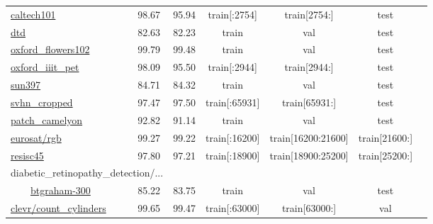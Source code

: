 \documentclass{article} \usepackage{iclr2023_conference,times}
\begin{document}
\begin{table*}[h]
\begin{tabular}{lcccccc}
\href{https://www.tensorflow.org/datasets/catalog/caltech101}{caltech101}
&  98.67  &  95.94
& train[{\tiny:2754}] & train[{\tiny2754:}] & test
& \citep{FeiFei2004LearningGV}
\\
\href{https://www.tensorflow.org/datasets/catalog/dtd}{dtd}
&  82.63  &  82.23
& train & val & test
& \citep{Cimpoi2014DescribingTI}
\\
\href{https://www.tensorflow.org/datasets/catalog/oxford_flowers102}{oxford\_flowers102}
&  99.79  &  99.48
& train & val & test
& \hspace{-10pt}\citep{Nilsback2008AutomatedFC}
\\
\href{https://www.tensorflow.org/datasets/catalog/oxford_iiit_pet}{oxford\_iiit\_pet}
&  98.09  &  95.50
& train[{\tiny:2944}] & train[{\tiny2944:}] & test
& \citep{Parkhi2012CatsAD}
\\
\href{https://www.tensorflow.org/datasets/catalog/sun397}{sun397}
&  84.71  &  84.32
& train & val & test
& \citep{Xiao2010SUNDL}
\\
\href{https://www.tensorflow.org/datasets/catalog/svhn_cropped}{svhn\_cropped}
&  97.47  &  97.50
& train[{\tiny:65931}] & train[{\tiny65931:}] & test
& \citep{Netzer2011ReadingDI}
\\
\href{https://www.tensorflow.org/datasets/catalog/patch_camelyon}{patch\_camelyon}
&  92.82  &  91.14
& train & val & test
& \citep{Veeling2018RotationEC}
\\
\href{https://www.tensorflow.org/datasets/catalog/eurosat#eurosatrgb_default_config}{eurosat/rgb}
&  99.27  &  99.22
& train[{\tiny:16200}] & train[{\tiny16200:21600}] & train[{\tiny21600:}]
& \citep{Helber2019EuroSATAN}
\\
\href{https://www.tensorflow.org/datasets/catalog/resisc45}{resisc45}
&  97.80  &  97.21
& train[{\tiny:18900}] & train[{\tiny18900:25200}] & train[{\tiny25200:}]
& \citep{Cheng2017RemoteSI}
\\
\multicolumn{2}{l}{
diabetic\_retinopathy\_detection/...
}
\\
\ \ \ \ \href{https://www.tensorflow.org/datasets/catalog/diabetic_retinopathy_detection/#diabetic_retinopathy_detectionbtgraham-300}{btgraham-300}
&  85.22  &  83.75
& train & val & test
& \hspace{-10pt}\citep{kaggle-diabetic-retinopathy}
\\
\href{https://www.tensorflow.org/datasets/catalog/clevr}{clevr/count\_cylinders}
&  99.65  &  99.47
& train[{\tiny:63000}] & train[{\tiny63000:}] & val
& \citep{Johnson2017CLEVRAD}
\\

\end{tabular}
\end{table*}
\end{document}
